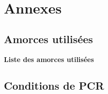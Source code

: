 \newpage
{}
\setcounter{page}{1}

\begin{multicols}{2}
\rmfamily
\tiny

\end{multicols}
\newpage


\setcounter{section}{0}
\section{Annexes}


\setcounter{subsection}{1}
\subsection{Amorces utilisées}
\label{subsec:annexe-amorces}


\caption[Liste des amorces utilisées]{\label{fig:amorces}\textbf{Liste des
    amorces utilisées}}

\subsection{Conditions de PCR}
\label{subsec:annexe-pcr}

